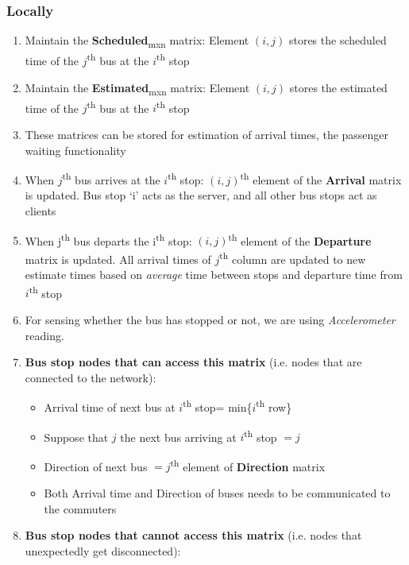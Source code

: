 \subsubsection{Locally}

\begin{enumerate}

    \item Maintain the \textbf{Scheduled}\textsubscript{mxn} matrix: Element $(i, j)$ stores the scheduled time of the $j$\textsuperscript{th} bus at the $i$\textsuperscript{th} stop
    \item Maintain the \textbf{Estimated}\textsubscript{mxn} matrix: Element $(i, j)$ stores the estimated time of the $j$\textsuperscript{th} bus at the $i$\textsuperscript{th} stop
    \item These matrices can be stored for estimation of arrival times, the passenger waiting functionality
    \item When $j$\textsuperscript{th} bus arrives at the $i$\textsuperscript{th} stop: $(i, j)$\textsuperscript{th} element of the \textbf{Arrival} matrix is updated. Bus stop `i' acts as the server, and all other bus stops act as clients
    \item When j\textsuperscript{th} bus departs the i\textsuperscript{th} stop: $(i, j)$\textsuperscript{th} element of the \textbf{Departure} matrix is updated. All arrival times of $j$\textsuperscript{th} column are updated to new estimate times based on \textit{average} time between stops and departure time from $i$\textsuperscript{th} stop
    \item For sensing whether the bus has stopped or not, we are using \textit{Accelerometer} reading.
    \item \textbf{Bus stop nodes that can access this matrix} (i.e. nodes that are connected to the network):
          \begin{itemize}
              \item Arrival time of next bus at $i$\textsuperscript{th} stop= min\{$i$\textsuperscript{th} row\}
              \item Suppose that $j$ the next bus arriving at $i$\textsuperscript{th} stop $= j$
              \item Direction of next bus $= j$\textsuperscript{th} element of \textbf{Direction} matrix
              \item Both Arrival time and Direction of buses needs to be communicated to the commuters
          \end{itemize}
    \item \textbf{Bus stop nodes that cannot access this matrix} (i.e. nodes that unexpectedly get disconnected):

\end{enumerate}
